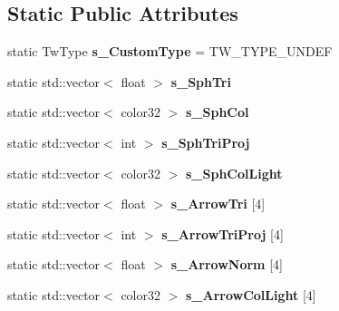 \subsection*{Static Public Attributes}
\begin{DoxyCompactItemize}
\item 
\hypertarget{struct_c_quaternion_ext_ab73182fdeffc722e43d04996fb895740}{static Tw\+Type {\bfseries s\+\_\+\+Custom\+Type} = T\+W\+\_\+\+T\+Y\+P\+E\+\_\+\+U\+N\+D\+E\+F}\label{struct_c_quaternion_ext_ab73182fdeffc722e43d04996fb895740}

\item 
\hypertarget{struct_c_quaternion_ext_a67ce90326465d79fd5f0c872598427c5}{static std\+::vector$<$ float $>$ {\bfseries s\+\_\+\+Sph\+Tri}}\label{struct_c_quaternion_ext_a67ce90326465d79fd5f0c872598427c5}

\item 
\hypertarget{struct_c_quaternion_ext_aa0e9a4c00258a765f7a5406818322bd2}{static std\+::vector$<$ color32 $>$ {\bfseries s\+\_\+\+Sph\+Col}}\label{struct_c_quaternion_ext_aa0e9a4c00258a765f7a5406818322bd2}

\item 
\hypertarget{struct_c_quaternion_ext_ad0f9222bfdea29bad38a1c6941b0eb73}{static std\+::vector$<$ int $>$ {\bfseries s\+\_\+\+Sph\+Tri\+Proj}}\label{struct_c_quaternion_ext_ad0f9222bfdea29bad38a1c6941b0eb73}

\item 
\hypertarget{struct_c_quaternion_ext_a6c0bf54a281ba6e9b4fdf5f567ed050c}{static std\+::vector$<$ color32 $>$ {\bfseries s\+\_\+\+Sph\+Col\+Light}}\label{struct_c_quaternion_ext_a6c0bf54a281ba6e9b4fdf5f567ed050c}

\item 
\hypertarget{struct_c_quaternion_ext_affd6f82c68d66eb2ea960ef3c52ce901}{static std\+::vector$<$ float $>$ {\bfseries s\+\_\+\+Arrow\+Tri} \mbox{[}4\mbox{]}}\label{struct_c_quaternion_ext_affd6f82c68d66eb2ea960ef3c52ce901}

\item 
\hypertarget{struct_c_quaternion_ext_ad602a0d9c65422f3deff65a8246a45ba}{static std\+::vector$<$ int $>$ {\bfseries s\+\_\+\+Arrow\+Tri\+Proj} \mbox{[}4\mbox{]}}\label{struct_c_quaternion_ext_ad602a0d9c65422f3deff65a8246a45ba}

\item 
\hypertarget{struct_c_quaternion_ext_a5575a636925723c5c2ce2efc4510ba14}{static std\+::vector$<$ float $>$ {\bfseries s\+\_\+\+Arrow\+Norm} \mbox{[}4\mbox{]}}\label{struct_c_quaternion_ext_a5575a636925723c5c2ce2efc4510ba14}

\item 
\hypertarget{struct_c_quaternion_ext_ad826b9c588ee9dc33401612cdbd61ccf}{static std\+::vector$<$ color32 $>$ {\bfseries s\+\_\+\+Arrow\+Col\+Light} \mbox{[}4\mbox{]}}\label{struct_c_quaternion_ext_ad826b9c588ee9dc33401612cdbd61ccf}

\end{DoxyCompactItemize}


